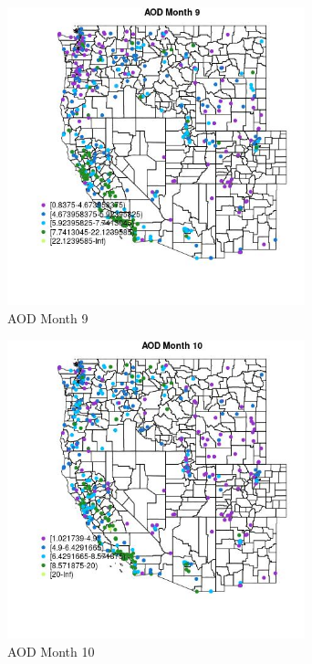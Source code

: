 \begin{figure} 
\centering  
\includegraphics[width=0.77\textwidth]{Code_Outputs/ML_input_report_ML_input_PM25_Step5_part_d_de_duplicated_aves_ML_input_MapObsMo9AOD.jpg} 
\caption{\label{fig:ML_input_report_ML_input_PM25_Step5_part_d_de_duplicated_aves_ML_inputMapObsMo9AOD}AOD Month 9} 
\end{figure} 
 

\begin{figure} 
\centering  
\includegraphics[width=0.77\textwidth]{Code_Outputs/ML_input_report_ML_input_PM25_Step5_part_d_de_duplicated_aves_ML_input_MapObsMo10AOD.jpg} 
\caption{\label{fig:ML_input_report_ML_input_PM25_Step5_part_d_de_duplicated_aves_ML_inputMapObsMo10AOD}AOD Month 10} 
\end{figure} 
 

